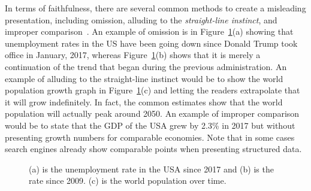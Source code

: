 \documentclass[11pt]{article}
\begin{document}
In terms of faithfulness, there are several common methods to create a misleading presentation, including 
 omission, alluding to the {\em straight-line instinct}, and improper comparison~\cite{factfulness}. An example of omission is in Figure~\ref{fig:fig}(a) showing that unemployment rates in the US have been going down since Donald Trump took office in January, 2017, whereas Figure~\ref{fig:fig}(b)  shows that it is merely a continuation of the trend that began during the previous administration. An example of alluding to the straight-line instinct would be to show the world population growth graph in Figure~\ref{fig:fig}(c) and letting the readers extrapolate that it will grow indefinitely. In fact, the common estimates show that the world population will actually peak around 2050. An example of improper comparison would be to state that the GDP of the USA grew by 2.3\% in 2017 but without presenting growth numbers for comparable economies. Note that in some cases search engines already show comparable points when presenting structured data. 

 \begin{figure}
\centering   
{}

\caption{(a) is the unemployment rate in the USA since 2017 and (b) is the rate since 2009. (c) is the world population over time.}
\label{fig:fig}
\end{figure}
\end{document}

